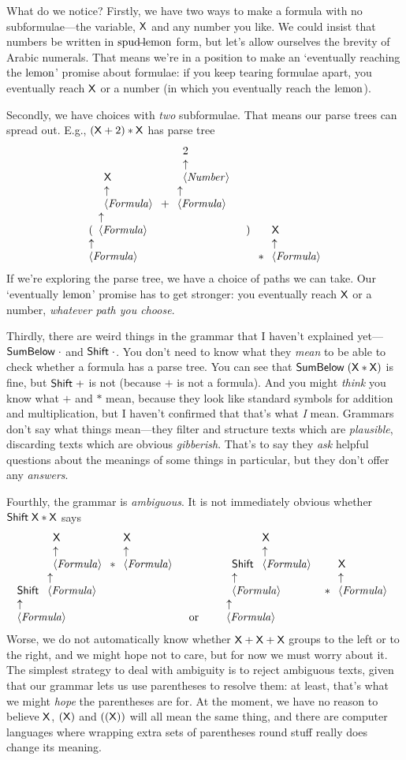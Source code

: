 \documentclass{book}
\begin{document}
What do we notice? Firstly, we have two ways to make a formula with no subformulae---the variable, $\X$ and any number you like. We could insist that numbers be written in $\spud\lemon$ form, but let's allow ourselves the brevity of Arabic numerals. That means we're in a position to make an `eventually reaching the $\lemon$' promise about formulae: if you keep tearing formulae apart, you eventually reach $\X$ or a number (in which you eventually reach the $\lemon$).

Secondly, we have choices with \emph{two} subformulae. That means our parse trees can spread out. E.g., $(\X + 2)*\X$ has parse tree
\[
\nta{Formula}{(\nta{Formula}{\nta{Formula}{\X} +  \nta{Formula}{\nta{Number}{2}}})}
*
\nta{Formula}{\X}
\]
If we're exploring the parse tree, we have a choice of paths we can take. Our `eventually $\lemon$' promise has to get stronger: you eventually reach $\X$ or a number, \emph{whatever path you choose}.

Thirdly, there are weird things in the grammar that I haven't explained yet---$\SB\cdot$ and $\SH\cdot$. You don't need to know what they \emph{mean} to be able to check whether a formula has a parse tree. You can see that $\SB(\X * \X)$ is fine, but $\SH +$ is not (because $+$ is not a formula). And you might \emph{think} you know what $+$ and $*$ mean, because they look like standard symbols for addition and multiplication, but I haven't confirmed that that's what \emph{I} mean. Grammars don't say what things mean---they filter and structure texts which are \emph{plausible}, discarding texts which are obvious \emph{gibberish}. That's to say they \emph{ask} helpful questions about the meanings of some things in particular, but they don't offer any \emph{answers}.

Fourthly, the grammar is \emph{ambiguous}. It is not immediately obvious whether $\SH\X*\X$ says
\[
\nta{Formula}{\SH\nta{Formula}{\nta{Formula}{\X}*\nta{Formula}{\X}}}
\mbox{or}\qquad
\nta{Formula}{\nta{Formula}{\SH\nta{Formula}{\X}}*\nta{Formula}{\X}}
\]
Worse, we do not automatically know whether $\X+\X+\X$ groups to the left or to the right, and we might hope not to care, but for now we must worry about it. The simplest strategy to deal with ambiguity is to reject ambiguous texts, given that our grammar lets us use parentheses to resolve them: at least, that's what we might \emph{hope} the parentheses are for. At the moment, we have no reason to believe $\X$, $(\X)$ and $((\X))$ will all mean the same thing, and there are computer languages where wrapping extra sets of parentheses round stuff really does change its meaning.
\end{document}
